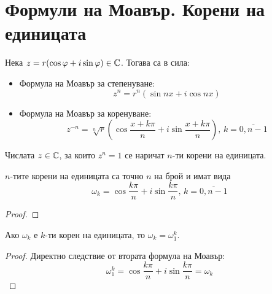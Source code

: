 \section{Формули на Моавър. Корени на единицата}

\begin{definition}
    Нека $z = r(\cos\varphi + i\sin\varphi) \in \mathbb{C}$. Тогава са в сила:
    \begin{itemize}
        \item Формула на Моавър за степенуване:
            \[z^n = r^n\left(\sin{nx} + i\cos{nx}\right)\]
        
        \item Формула на Моавър за коренуване:
            \[z^{-n} = \sqrt[n]{r}\left(\cos\dfrac{x+k\pi}{n} + i\sin\dfrac{x+k\pi}{n}\right),\, k = \overline{0,n-1}\]
    \end{itemize}
\end{definition}

\begin{definition}
    Числата $z \in \mathbb{C}$, за които $z^n = 1$ се наричат $n$-ти корени на единицата.
\end{definition}

\begin{corollary}
    $n$-тите корени на единицата са точно $n$ на брой и имат вида
    \[\omega_k = \cos\frac{k\pi}{n} + i\sin\frac{k\pi}{n},\, k = \overline{0,n-1}\]
    \begin{proof}
    \end{proof}
\end{corollary}

\begin{corollary}
    Ако $\omega_k$ е $k$-ти корен на единицата, то $\omega_k = \omega_1^k$.
    \begin{proof}
        Директно следствие от втората формула на Моавър:
        \[\omega_1^k = \cos\frac{k\pi}{n} + i\sin\frac{k\pi}{n} = \omega_k\] 
    \end{proof}
\end{corollary}